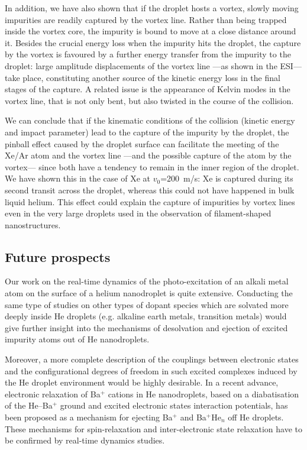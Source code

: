		In addition, we have also shown that if the droplet hosts a vortex, slowly moving impurities are readily captured by the vortex line. Rather than being trapped inside the vortex core, the impurity is bound to move at a close distance around it. Besides the crucial energy loss when the impurity hits the droplet, the capture by the vortex is favoured by a further energy transfer from the impurity to the droplet: large amplitude displacements of the vortex line ---as shown in the ESI\citep{ESI}--- take place, constituting another source of the kinetic energy loss in the final stages of the capture. A related issue is the appearance of Kelvin modes in the vortex line, that is not only bent, but also twisted in the course of the collision.

		We can conclude that if the kinematic conditions of the collision (kinetic energy and impact parameter) lead to the capture of the impurity by the droplet, the pinball effect caused by the droplet surface can facilitate the meeting of the Xe/Ar atom and the vortex line ---and the possible capture of the atom by the vortex--- since both have a tendency to remain in the inner region of the droplet. We have shown this in the case of Xe at $v_0$=200~m/s: Xe is captured during its second transit across the droplet, whereas this could not have happened in bulk liquid helium\citep{Psh16}. This effect could explain the capture of impurities by vortex lines even in the very large droplets used in the observation of filament-shaped nanostructures.

	\subsection*{Future prospects}
	Our work on the real-time dynamics of the photo-excitation of an alkali metal atom on the surface of a helium nanodroplet is quite extensive. Conducting the same type of studies on other types of dopant species which are solvated more deeply inside He droplets (e.g. alkaline earth metals, transition metals) would give further insight into the mechanisms of desolvation and ejection of excited impurity atoms out of He nanodroplets\citep{Loginov:2007,Loginov:2012, Kautsch:2013,Lindebner:2014}.
	
	Moreover, a more complete description of the couplings between electronic states and the configurational degrees of freedom in such excited complexes induced by the He droplet environment would be highly desirable\citep{Closser:2014,Masson:2014}. In a recent advance, electronic relaxation of Ba$^+$ cations in He nanodroplets, based on a diabatisation of the He–Ba$^+$ ground and excited electronic states interaction potentials\citep{Vindel:2018}, has been proposed as a mechanism for ejecting Ba$^+$ and Ba$^+$He$_n$ off He droplets. These mechanisms for spin-relaxation and inter-electronic state relaxation have to be confirmed by real-time dynamics studies.
	

